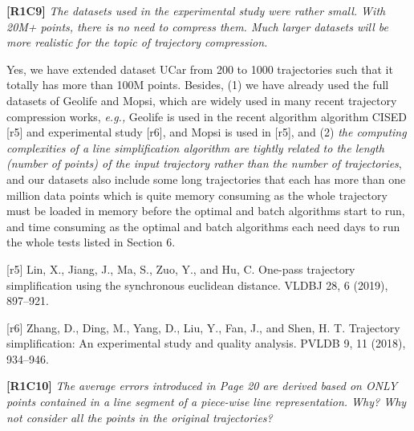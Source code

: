 \documentclass{letter}
\newcommand{\kw}[1]{{\ensuremath {\mathsf{#1}}}\xspace}
\newcommand{\ie}{\emph{i.e.,}\xspace}
\newcommand{\eg}{\emph{e.g.,}\xspace}
\begin{document}
{%





\textbf{[R1C9]} \emph{ The datasets used in the experimental study were rather small. With 20M+ points, there is no need to compress them. Much larger datasets will be more realistic for the topic of trajectory compression.  }

Yes, we have extended dataset UCar from 200 to 1000 trajectories such that it totally has more than {100M} points. Besides, (1) we have already used the full datasets of Geolife and Mopsi, which are widely used in many recent trajectory compression works, \eg Geolife is used in the recent algorithm algorithm CISED [r5] and experimental study [r6], and Mopsi is used in [r5], and (2) \emph{the computing complexities of a line simplification algorithm are tightly related to the length (number of points) of the input trajectory rather than the number of trajectories}, and our datasets also include some long trajectories that each has more than {one million} data points which is quite memory consuming as the whole trajectory must be loaded in memory before the optimal and batch algorithms start to run, and time consuming as the optimal and batch algorithms each need {days} to run the whole tests listed in Section 6. %

[r5] Lin, X., Jiang, J., Ma, S., Zuo, Y., and Hu, C. One-pass trajectory simplification using the synchronous euclidean distance. VLDBJ 28, 6 (2019), 897–921.

[r6] Zhang, D., Ding, M., Yang, D., Liu, Y., Fan, J., and Shen, H. T. Trajectory simplification: An experimental study and quality analysis. PVLDB 9, 11 (2018), 934–946.

\textbf{[R1C10]} \emph{The average errors introduced in Page 20 are derived based on ONLY points contained in a line segment of a piece-wise line representation. Why? Why not consider all the points in the original trajectories? }

}
\end{document}
